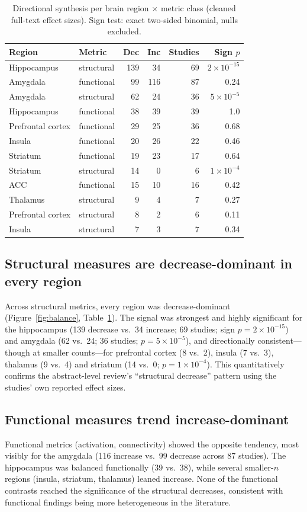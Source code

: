 \documentclass[11pt]{article}
\begin{document}
\begin{table}[t]
\centering
\caption{Directional synthesis per brain region $\times$ metric class (cleaned
full-text effect sizes). Sign test: exact two-sided binomial, nulls excluded.}
\label{tab:dir}
\begin{tabular}{llrrrr}
\toprule
Region & Metric & Dec & Inc & Studies & Sign $p$ \\
\midrule
Hippocampus & structural & 139 & 34 & 69 & $2\times10^{-15}$ \\
Amygdala & functional & 99 & 116 & 87 & 0.24 \\
Amygdala & structural & 62 & 24 & 36 & $5\times10^{-5}$ \\
Hippocampus & functional & 38 & 39 & 39 & 1.0 \\
Prefrontal cortex & functional & 29 & 25 & 36 & 0.68 \\
Insula & functional & 20 & 26 & 22 & 0.46 \\
Striatum & functional & 19 & 23 & 17 & 0.64 \\
Striatum & structural & 14 & 0 & 6 & $1\times10^{-4}$ \\
ACC & functional & 15 & 10 & 16 & 0.42 \\
Thalamus & structural & 9 & 4 & 7 & 0.27 \\
Prefrontal cortex & structural & 8 & 2 & 6 & 0.11 \\
Insula & structural & 7 & 3 & 7 & 0.34 \\
\bottomrule
\end{tabular}
\end{table}

\subsection{Structural measures are decrease-dominant in every region}
Across structural metrics, every region was decrease-dominant
(Figure~\ref{fig:balance}, Table~\ref{tab:dir}). The signal was strongest and highly significant for the
hippocampus (139 decrease vs.\ 34 increase; 69 studies; sign
$p=2\times10^{-15}$) and amygdala (62 vs.\ 24; 36 studies; $p=5\times10^{-5}$),
and directionally consistent---though at smaller counts---for prefrontal cortex
(8 vs.\ 2), insula (7 vs.\ 3), thalamus (9 vs.\ 4) and striatum (14 vs.\ 0;
$p=1\times10^{-4}$). This quantitatively confirms the abstract-level review's
``structural decrease'' pattern using the studies' own reported effect sizes.

\subsection{Functional measures trend increase-dominant}
Functional metrics (activation, connectivity) showed the opposite tendency, most
visibly for the amygdala (116 increase vs.\ 99 decrease across 87 studies). The
hippocampus was balanced functionally (39 vs.\ 38), while several smaller-$n$
regions (insula, striatum, thalamus) leaned increase. None of the functional
contrasts reached the significance of the structural decreases, consistent with
functional findings being more heterogeneous in the literature.
\end{document}
